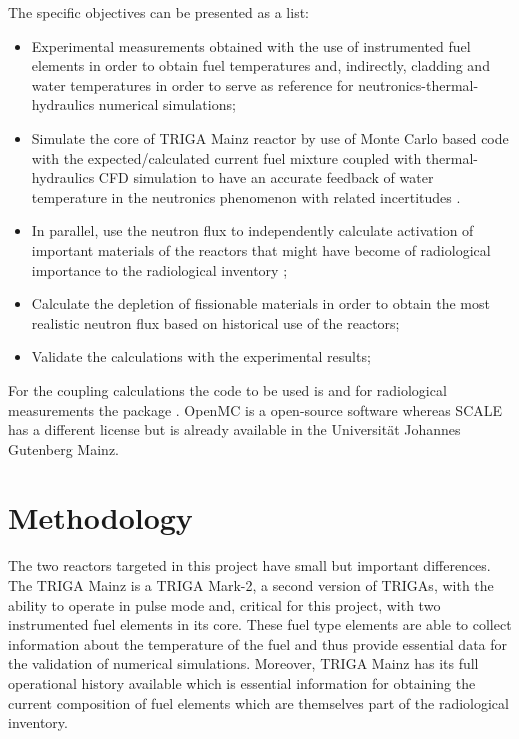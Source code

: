 \documentclass[11pt]{article} %
\begin{document}
The specific objectives can be presented as a list:
\begin{itemize}
  \item  Experimental measurements obtained with the use of instrumented fuel elements in order to obtain fuel temperatures and, indirectly, cladding and water temperatures in order to serve as reference for neutronics-thermal-hydraulics numerical simulations;
  \item Simulate the core of TRIGA Mainz reactor by use of Monte Carlo based code with the expected/calculated current fuel mixture coupled with thermal-hydraulics CFD simulation to have an accurate feedback of water temperature in the neutronics phenomenon with related incertitudes \cite[p.~165-170]{Neutronics_CEA-e-DEN_2015}. 
  \item In parallel, use the neutron flux to independently calculate activation of important materials of the reactors that might have become of radiological importance to the radiological inventory \cite[p.~24]{Clean-up_CEA-e-DEN_2018};
  \item Calculate the depletion of fissionable materials in order to obtain the most realistic neutron flux based on historical use of the reactors;
  \item Validate the calculations with the experimental results;
\end{itemize}

For the coupling calculations the code to be used is \cite{OpenMC_2015} and for radiological measurements the package \cite{SCALE_632}. OpenMC is a open-source software whereas SCALE has a different license but is already available in the Universität Johannes Gutenberg Mainz.


\section{Methodology}

The two reactors targeted in this project have small but important differences. The TRIGA Mainz is a TRIGA Mark-2, a second version of TRIGAs, with the ability to operate in pulse mode and, critical for this project, with two instrumented fuel elements in its core. These fuel type elements are able to collect information about the temperature of the fuel and thus provide essential data for the validation of numerical simulations. Moreover, TRIGA Mainz has its full operational history available which is essential information for obtaining the current composition of fuel elements which are themselves part of the radiological inventory.
\end{document}
